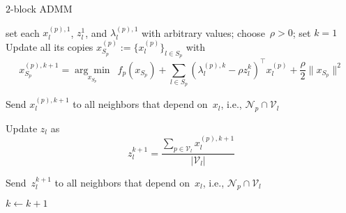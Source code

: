 \documentclass[letter,10pt]{article}
\theoremstyle{definition}
\theoremstyle{nonumberplain}
\begin{document}
	\begin{algorithm}
			\caption{$2$-block ADMM~\cite{Boyd10-ADMM}}
			\algrenewcommand{}
			\label{Alg:BoydADMM}
    \begin{algorithmic}[1]
    \small
    \Require set each $x_l^{(p),1}$, $z_l^1$, and $\lambda_l^{(p),1}$ with arbitrary values; choose~$\rho > 0$; set $k=1$
    \Repeat
				\State Update all its copies $x_{S_p}^{(p)} := \{x_l^{(p)}\}_{l \in S_p}$ with
					$$
						x_{S_p}^{(p),k+1} = \underset{x_{S_p}}{\arg\min} \,\,\, f_p(x_{S_p}) + \sum_{l\in S_p} (\lambda_l^{(p),k} - \rho z_l^k)^\top x_l^{(p)} + \frac{\rho}{2}\|x_{S_p}\|^2
					$$

				\State Send $x_l^{(p),k+1}$ to all neighbors that depend on~$x_l$, i.e., $\mathcal{N}_p \cap \mathcal{V}_l$
      \EndFor

				\State Update $z_l$ as
					$$
						z_l^{k+1} = \frac{\sum_{p \in \mathcal{V}_l} x_l^{(p),k+1}}{ |\mathcal{V}_l|}
					$$

				\State Send~$z_l^{k+1}$ to all neighbors that depend on~$x_l$, i.e., $\mathcal{N}_p \cap \mathcal{V}_l$
      \EndFor

      \State $k \gets k+1$

    \end{algorithmic}
  \end{algorithm}


\pagebreak


\end{document}
